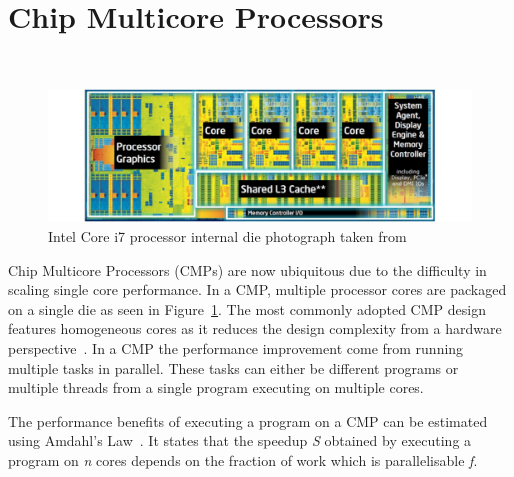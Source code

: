 
\section{Chip Multicore Processors}~\label{sec:cmp}

\begin{figure}[t]
 \center
 \includegraphics[width=1\textwidth]{background/graphics/i7intel.pdf}
 \caption{Intel Core i7 processor internal die photograph taken from~\cite{turleywhite}}\label{fig:i7}
\end{figure}
 
Chip Multicore Processors (CMPs) are now ubiquitous due to the difficulty in scaling single core performance.
In a CMP, multiple processor cores are packaged on a single die as seen in Figure~\ref{fig:i7}.
The most commonly adopted CMP design features homogeneous cores as it reduces the design complexity from a hardware perspective~\cite{asanovic2006landscape}.
In a CMP the performance improvement come from running multiple tasks in parallel.
These tasks can either be different programs or multiple threads from a single program executing on multiple cores.

The performance benefits of executing a program on a CMP can be estimated using Amdahl's Law~\cite{amdahl1967validity}.
It states that the speedup \textit{S} obtained by executing a program on \textit{n} cores depends on the fraction of work which is parallelisable \textit{f}.

